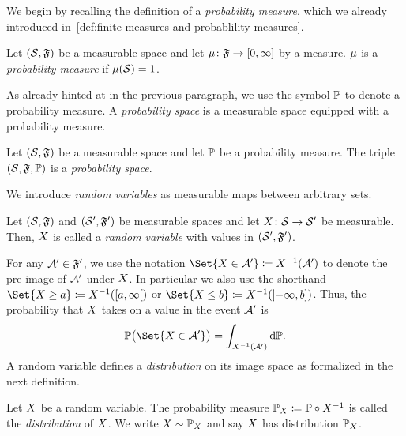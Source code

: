 We begin by recalling the definition of a \emph{probability measure}, which we already introduced in~\cref{def:finite measures and probablility measures}.
\begin{definition}%
	\label{def:probability measure}
	Let \( (\mathcal{S}, \mathfrak{F}) \) be a measurable space and let \( \map{\Measure}{\SigmaAlgebraSymbol}{\interval{\num{0}}{\infty}} \) by a measure.
	\( \mu \) is a \emph{probability measure} if \( \mu(\mathcal{S}) = 1 \).
\end{definition}
As already hinted at in the previous paragraph, we use the symbol \( \mathbb{P} \) to denote a probability measure.
A \emph{probability space} is a measurable space equipped with a probability measure.
\begin{definition}
	\label{def:probability space}
	Let \( (\mathcal{S}, \mathfrak{F}) \) be a measurable space and let \( \mathbb{P} \) be a probability measure.
	The triple \( (\mathcal{S}, \mathfrak{F}, \mathbb{P}) \) is a \emph{probability space}.
\end{definition}
We introduce \emph{random variables} as measurable maps between arbitrary sets.
\begin{definition}%
	\label{def:random variable}
	Let \( (\mathcal{S}, \mathfrak{F}) \) and \( (\mathcal{S}^\prime, \mathfrak{F}^\prime) \) be measurable spaces and let \( X \colon \mathcal{S} \to \mathcal{S}^\prime \) be measurable.
	Then, \( X \) is called a \emph{random variable} with values in \( (\mathcal{S}^\prime, \mathfrak{F}^\prime) \).
\end{definition}
For any \( \mathcal{A}^\prime \in \mathfrak{F}^\prime \), we use the notation \( \Set{\RandomVariable \in \Event} \coloneqq \PreImage{X}(\Event) \) to denote the pre-image of \( \mathcal{A}^\prime \) under \( X \).
In particular we also use the shorthand \( \Set{ \RandomVariable \geq a } \coloneqq \PreImage{\RandomVariable}(\rinterval{a}{\infty}) \) or \( \Set{ \RandomVariable \leq b } \coloneqq \PreImage{\RandomVariable}(\linterval{-\infty}{b}) \).
Thus, the probability that \( X \) takes on a value in the event \( \mathcal{A}^\prime \) is
\begin{equation}
	\ProbabilityMeasure\bigl( \Set{\RandomVariable \in \Event} \bigr) = \int_{\PreImage{\RandomVariable}(\Event)} \mathrm{d}\ProbabilityMeasure.
\end{equation}
A random variable defines a \emph{distribution} on its image space as formalized in the next definition.
\begin{definition}[Distribution]%
	\label{def:distribution}
	Let \( X \) be a random variable.
	The probability measure \( \mathbb{P}_X \coloneqq \mathbb{P} \circ {X}^{-1} \) is called the \emph{distribution} of \( X \).
	We write \( X \sim \mathbb{P}_X \) and say \( X \) has distribution \( \mathbb{P}_X \).
\end{definition}
